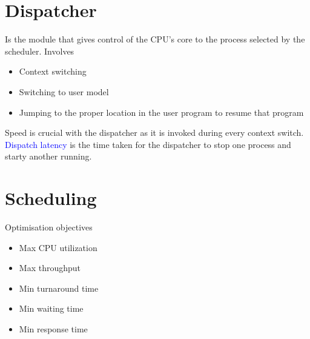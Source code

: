 \documentclass[oneside]{book}
\begin{document}
        \section{Dispatcher}
            Is the module that gives control of the CPU's core to the process selected by the scheduler.
            Involves
            \begin{itemize}
                \item Context switching
                \item Switching to user model
                \item Jumping to the proper location in the user program to resume that program
            \end{itemize}
            Speed is crucial with the dispatcher as it is invoked during every context switch.\\
            \textcolor{blue}{Dispatch latency} is the time taken for the dispatcher to stop one process and
            starty another running.\\
        \section{Scheduling}
            Optimisation objectives
            \begin{itemize}
                \item Max CPU utilization
                \item Max throughput
                \item Min turnaround time
                \item Min waiting time
                \item Min response time
            \end{itemize}
\end{document}
